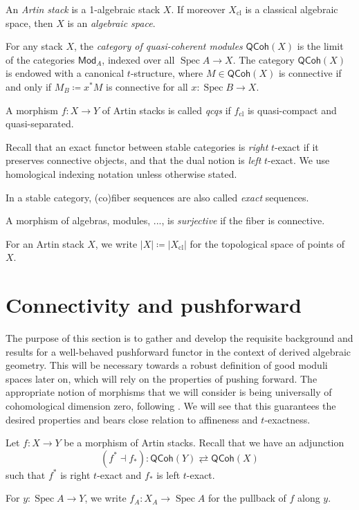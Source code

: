 \documentclass[a4paper,twoside,11pt]{amsart}
\theoremstyle{plain}
\theoremstyle{definition}
\theoremstyle{remark}
\numberwithin{equation}{section}
\newcommand\Mod{\mathsf{Mod}}
\DeclareMathOperator{\Spec}{Spec} %
\newcommand{\QCoh}{\mathsf{QCoh}}
\newcommand{\cl}{\mathrm{cl}} %
\begin{document}
An \emph{Artin stack} is a 1-algebraic stack $X$. If moreover $X_\cl$ is a classical algebraic space, then $X$ is an \emph{algebraic space}.

For any stack $X$, the \emph{category of quasi-coherent modules} $\QCoh(X)$ is the limit of the categories $\Mod_A$, indexed over all $\Spec A \to X$. The category $\QCoh(X)$ is endowed with a canonical $t$-structure, where $M \in \QCoh(X)$ is connective if and only if $M_B \coloneqq x^*M$ is connective for all $x \colon \Spec B \to X$.

A morphism $f \colon X \to Y$ of Artin stacks is called \emph{qcqs} if $f_\cl$ is quasi-compact and quasi-separated. 

Recall that an exact functor between stable categories is \emph{right} $t$-exact if it preserves connective objects, and that the dual notion is \emph{left} $t$-exact. We use homological indexing notation unless otherwise stated.

In a stable category, (co)fiber sequences are also called \emph{exact} sequences.

A morphism of algebras, modules, ..., is \emph{surjective} if the fiber is connective. 

For an Artin stack $X$, we write $\lvert X \rvert \coloneqq \lvert X_\cl \rvert$ for the topological space of points of $X$.

\section{Connectivity and pushforward} \label{sec:2}

The purpose of this section is to gather and develop the requisite background and results for a well-behaved pushforward functor in the context of derived algebraic geometry. This will be necessary towards a robust definition of good moduli spaces later on, which will rely on the properties of pushing forward. The appropriate notion of morphisms that we will consider is being universally of cohomological dimension zero, following \cite{HalpernleistnerMapping}. We will see that this guarantees the desired properties and bears close relation to affineness and $t$-exactness.
\medskip

Let $f \colon X \to Y$ be a morphism of Artin stacks. Recall that we have an adjunction
\[ (f^* \dashv f_*) \colon \QCoh(Y) \rightleftarrows \QCoh(X) \]
such that $f^*$ is right $t$-exact and $f_*$ is left $t$-exact.

For $y \colon \Spec A \to Y$, we write $f_A \colon X_A \to \Spec A$ for the pullback of $f$ along $y$.
\end{document}
